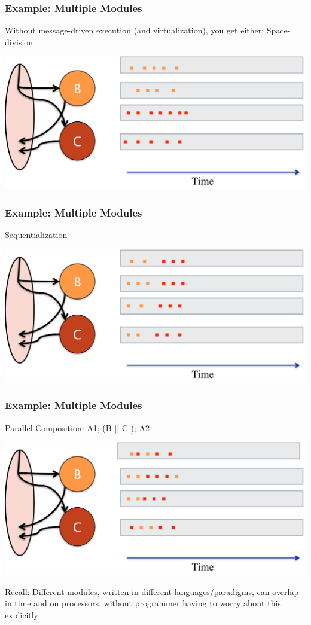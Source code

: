 \begin{frame}[t]
\frametitle{Example: Multiple Modules}
Without message-driven execution (and virtualization), you get either: Space-division

  \begin{center} \includegraphics[width=\textwidth]{figures/stencil_space} \end{center}
\end{frame}

\begin{frame}[t]
\frametitle{Example: Multiple Modules}
Sequentialization

  \begin{center} \includegraphics[width=\textwidth]{figures/stencil_seq} \end{center}
\end{frame}

\begin{frame}[t]
\frametitle{Example: Multiple Modules}
Parallel Composition: A1; (B || C ); A2
  \begin{center} \includegraphics[width=\textwidth]{figures/stencil_charm} \end{center}
Recall: Different modules, written in different languages/paradigms, can overlap
in time and on processors, without programmer having to worry about this
explicitly

\end{frame}

